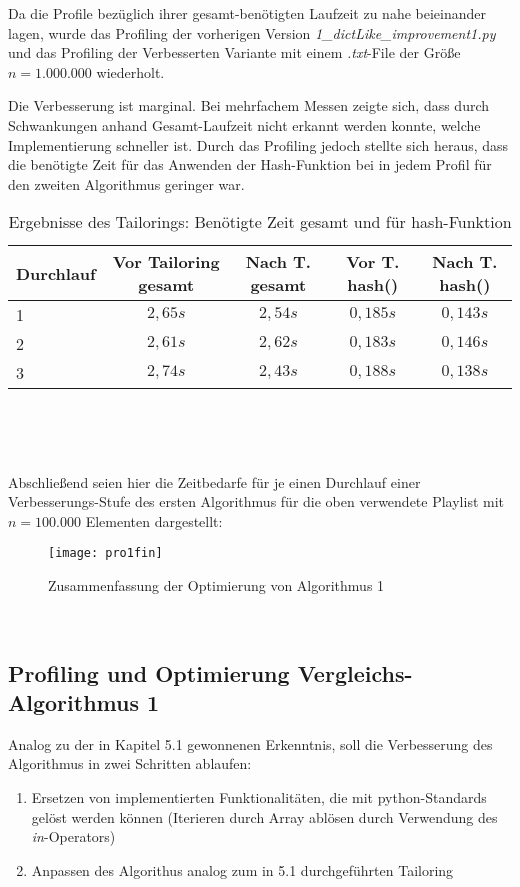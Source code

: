 \documentclass[
10pt, %
a4paper, %
oneside, %
headinclude,footinclude, %
BCOR5mm, %
]{scrartcl}
\begin{document}
Da die Profile bezüglich ihrer gesamt-benötigten Laufzeit zu nahe beieinander lagen, wurde das Profiling der vorherigen Version \textit{1\_dictLike\_improvement1.py} und das Profiling der Verbesserten Variante mit einem \textit{.txt}-File der Größe \(n=1.000.000\) wiederholt.

Die Verbesserung ist marginal. Bei mehrfachem Messen zeigte sich, dass durch Schwankungen anhand Gesamt-Laufzeit nicht erkannt werden konnte, welche Implementierung schneller ist. Durch das Profiling jedoch stellte sich heraus, dass die benötigte Zeit für das Anwenden der Hash-Funktion bei in jedem Profil für den zweiten Algorithmus geringer war.


\begin{table}[h!]
	\centering 
	\begin{tabular}{|l|c|c|c|c|}
		\hline 
		Durchlauf & Vor Tailoring gesamt & Nach T. gesamt & Vor T. hash() & Nach T. hash()\\ 
		\hline
		1	& \(2,65s\)	& \(2,54s\)	& \(0,185s\) & \(0,143s\) \\
		\hline
		2	& \(2,61s\)	& \(2,62s\)	& \(0,183s\) & \(0,146s\) \\
		\hline
		3	& \(2,74s\)	& \(2,43s\)	& \(0,188s\) & \(0,138s\) \\
		\hline
	\end{tabular}\\
	\caption[Ergebnisse Tailoring]{Ergebnisse des Tailorings: Benötigte Zeit gesamt und für hash-Funktion}
\end{table}\

Abschließend seien hier die Zeitbedarfe für je einen Durchlauf einer Verbesserungs-Stufe des ersten Algorithmus für die oben verwendete Playlist mit \(n=100.000\) Elementen dargestellt:

\begin{figure}[h!]
	\centering 
	\texttt{[image: pro1fin]} 
	\caption[Zusammenfassung Optimierung Alg. 1]{Zusammenfassung der Optimierung von Algorithmus 1}
\end{figure}\

\subsection{Profiling und Optimierung Vergleichs-Algorithmus 1}
Analog zu der in Kapitel 5.1 gewonnenen Erkenntnis, soll die Verbesserung des Algorithmus in zwei Schritten ablaufen:
\begin{enumerate}[noitemsep]
	\item Ersetzen von implementierten Funktionalitäten, die mit python-Standards gelöst werden können (Iterieren durch Array ablösen durch Verwendung des \textit{in}-Operators)
	\item Anpassen des Algorithus analog zum in 5.1 durchgeführten Tailoring
\end{enumerate}\
\end{document}
